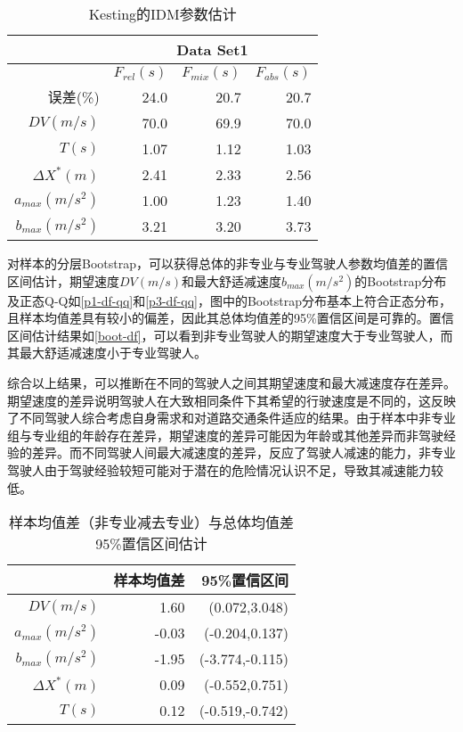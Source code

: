 \begin{table}[htbp]
  \centering
  \caption{Kesting\cite{Kesting2008}的IDM参数估计}
    \begin{tabular}{rrrr}
    \addlinespace
    \toprule
          & \multicolumn{ 3}{c}{Data Set1} \\
    \midrule
          & $F_{rel}(s)$ & $F_{mix}(s)$ & $F_{abs}(s)$ \\
    误差(\%)     & 24.0  & 20.7  & 20.7  \\
    $DV(m/s)$    & 70.0  & 69.9  & 70.0  \\
    $T(s)$    & 1.07  & 1.12  & 1.03  \\
    $\Delta X^*(m)$    & 2.41  & 2.33  & 2.56  \\
    $a_{max}(m/s^2)$     & 1.00  & 1.23  & 1.40  \\
    $b_{max}(m/s^2)$     & 3.21  & 3.20  & 3.73  \\
    \bottomrule
    \end{tabular}%
  \label{reference-idm}%
\end{table}%


对样本的分层Bootstrap，可以获得总体的非专业与专业驾驶人参数均值差的置信区间估计，期望速度$DV(m/s)$和最大舒适减速度$b_{max}(m/s^2)$的Bootstrap分布及正态Q-Q如\autoref{p1-df-qq}和\autoref{p3-df-qq}，图中的Bootstrap分布基本上符合正态分布，且样本均值差具有较小的偏差，因此其总体均值差的95\%置信区间是可靠的。置信区间估计结果如\autoref{boot-df}，可以看到非专业驾驶人的期望速度大于专业驾驶人，而其最大舒适减速度小于专业驾驶人。

综合以上结果，可以推断在不同的驾驶人之间其期望速度和最大减速度存在差异。期望速度的差异说明驾驶人在大致相同条件下其希望的行驶速度是不同的，这反映了不同驾驶人综合考虑自身需求和对道路交通条件适应的结果。由于样本中非专业组与专业组的年龄存在差异，期望速度的差异可能因为年龄或其他差异而非驾驶经验的差异。而不同驾驶人间最大减速度的差异，反应了驾驶人减速的能力，非专业驾驶人由于驾驶经验较短可能对于潜在的危险情况认识不足，导致其减速能力较低。


\begin{table}[htbp]
  \centering
  \caption{样本均值差（非专业减去专业）与总体均值差95\%置信区间估计}
    \begin{tabular}{rrr}
    \addlinespace
    \toprule
          & 样本均值差 & 95\%置信区间 \\
    \midrule
    $DV(m/s)$ & 1.60  & (0.072,3.048) \\
    $a_{max}(m/s^2)$ & -0.03  & (-0.204,0.137) \\
    $b_{max}(m/s^2)$ & -1.95  & (-3.774,-0.115) \\
    $\Delta X^*(m)$     & 0.09  & (-0.552,0.751) \\
    $T(s)$     & 0.12  & (-0.519,-0.742) \\
    \bottomrule
    \end{tabular}%
  \label{boot-df}%
\end{table}%

